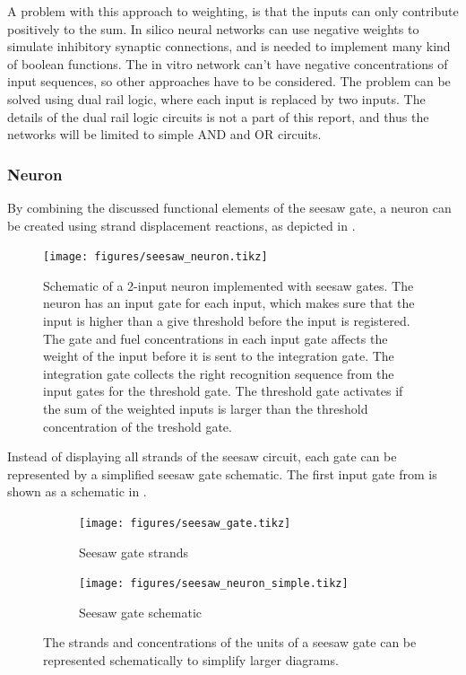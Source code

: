 A problem with this approach to weighting, is that the inputs can only contribute positively to the sum. In silico neural networks can use negative weights to simulate inhibitory synaptic connections, and is needed to implement many kind of boolean functions. The in vitro network can't have negative concentrations of input sequences, so other approaches have to be considered. The problem can be solved using dual rail logic, where each input is replaced by two inputs. The details of the dual rail logic circuits is not a part of this report, and thus the networks will be limited to simple AND and OR circuits.

\subsubsection{Neuron}
By combining the discussed functional elements of the seesaw gate, a neuron can be created using strand displacement reactions, as depicted in .


\begin{figure}[h]
\texttt{[image: figures/seesaw\_neuron.tikz]}
\caption{Schematic of a 2-input neuron implemented with seesaw gates. The neuron has an input gate for each input, which makes sure that the input is higher than a give threshold before the input is registered. The gate and fuel concentrations in each input gate affects the weight of the input before it is sent to the integration gate. The integration gate collects the right recognition sequence from the input gates for the threshold gate. The threshold gate activates if the sum of the weighted inputs is larger than the threshold concentration of the treshold gate.}
\label{seesaw_neuron}
\end{figure}

Instead of displaying all strands of the seesaw circuit, each gate can be represented by a simplified seesaw gate schematic. The first input gate from  is shown as a schematic in .

\begin{figure}[h]
  \begin{subfigure}[t]{.49\textwidth}
    \texttt{[image: figures/seesaw\_gate.tikz]}
    \caption{Seesaw gate strands}
  \end{subfigure}
  \quad
  \begin{subfigure}[t]{.49\textwidth}
    \texttt{[image: figures/seesaw\_neuron\_simple.tikz]}
    \caption{Seesaw gate schematic}
  \end{subfigure}
  \caption{The strands and concentrations of the units of a seesaw gate can be represented schematically to simplify larger diagrams.}
  \label{seesaw_gate_simple}
\end{figure}

